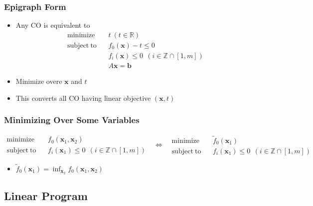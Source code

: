 \subsubsection*{Epigraph Form}
\begin{itemize}
    \item Any CO is equivalent to
    \begin{equation}\begin{aligned}
        \mathrm{minimize}~~&~~t~(t \in \mathbb{R}) \\
        \mathrm{subject~to}~~&~~f_0(\mathbf{x}) - t \leq 0 \\
            &~~f_i(\mathbf{x}) \leq 0~~(i \in \mathbb{Z} \cap [1,m]) \\
            &~~ A\mathbf{x} = \mathbf{b}
    \end{aligned}\end{equation}
    \item Minimize overe $\mathbf{x}$ and $t$
    \item This converts all CO having linear objective $(\mathbf{x}, t)$
\end{itemize}

\subsubsection*{Minimizing Over Some Variables}
\begin{equation}\begin{aligned}
    \mathrm{minimize}~~&~~f_0(\mathbf{x}_1, \mathbf{x}_2) \\
    \mathrm{subject~to}~~&~~f_i(\mathbf{x}_1) \leq 0~~(i \in \mathbb{Z} \cap [1,m])
\end{aligned}~~~\Leftrightarrow~~~\begin{aligned}
    \mathrm{minimize}~~&~~\tilde{f}_0(\mathbf{x}_1) \\
    \mathrm{subject~to}~~&~~f_i(\mathbf{x}_1) \leq 0~~(i \in \mathbb{Z} \cap [1,m])
\end{aligned}\end{equation}
\begin{itemize}
    \item $\tilde{f}_0(\mathbf{x}_1) = \inf_{\mathbf{x}_2} f_0 (\mathbf{x}_1, \mathbf{x}_2)$
\end{itemize}

\subsection{Linear Program}

